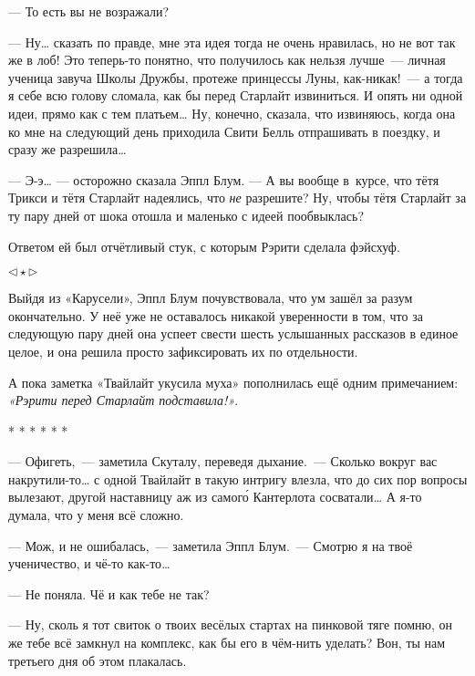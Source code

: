 \documentclass[fontsize=11pt,a5paper,titlepage=firstcover]{scrbook}
\begin{document}
--- То есть вы не возражали?

--- Ну{\ldots} сказать по правде, мне эта идея тогда не очень нравилась, но не вот так же в лоб! Это теперь-то понятно, что получилось как нельзя лучше~--- личная ученица завуча Школы Дружбы, протеже принцессы Луны, как-никак!~--- а тогда я себе всю голову сломала, как бы перед Старлайт извиниться. И опять ни одной идеи, прямо как с тем платьем{\ldots} Ну, конечно, сказала, что извиняюсь, когда она ко мне на следующий день приходила Свити Белль отпрашивать в поездку, и сразу же разрешила{\ldots}

--- Э-э{\ldots} --- осторожно сказала Эппл Блум. --- А вы вообще в~курсе, что тётя Трикси и тётя Старлайт надеялись, что \emph{не} разрешите? Ну, чтобы тётя Старлайт за ту пару дней от шока отошла и маленько с идеей пообвыклась?

Ответом ей был отчётливый стук, с которым Рэрити сделала фэйсхуф.
\begin{center}$\triangleleft\star\triangleright$\end{center}

Выйдя из «Карусели», Эппл Блум почувствовала, что ум зашёл за разум окончательно. У неё уже не оставалось никакой уверенности в том, что за следующую пару дней она успеет свести шесть услышанных рассказов в единое целое, и она решила просто зафиксировать их по отдельности.

А пока заметка «Твайлайт укусила муха» пополнилась ещё одним примечанием: \emph{«Рэрити перед Старлайт подставила!»}.

\vspace{2mm}
\begin{center}
	* * * * * *
\end{center}
\vspace{2mm}


--- Офигеть,~--- заметила Скуталу, переведя дыхание.~--- Сколько вокруг вас накрутили-то{\ldots} с одной Твайлайт в такую интригу влезла, что до сих пор вопросы вылезают, другой наставницу аж из самого́ Кантерлота сосватали{\ldots} А я-то думала, что у меня всё сложно.

--- Мож, и не ошибалась,~--- заметила Эппл Блум.~--- Смотрю я на твоё ученичество, и чё-то как-то{\ldots}

--- Не поняла. Чё и как тебе не так?

--- Ну, сколь я тот свиток о твоих весёлых стартах на пинковой тяге помню, он же тебе всё замкнул на комплекс, как бы его в чём-нить уделать? Вон, ты нам третьего дня об этом плакалась.
\end{document}
